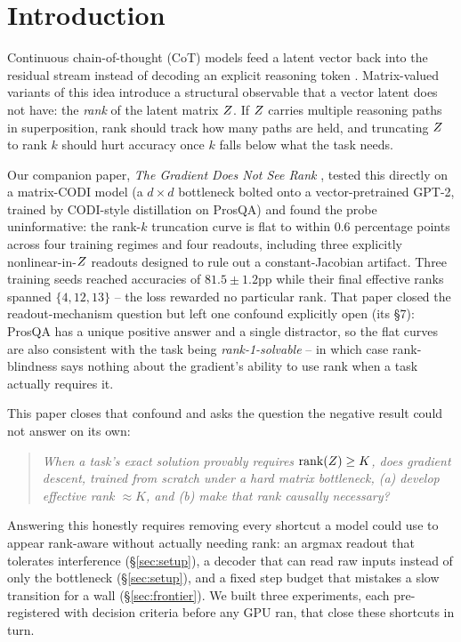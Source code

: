 \section{Introduction}
\label{sec:intro}

Continuous chain-of-thought (CoT) models feed a latent vector back into the
residual stream instead of decoding an explicit reasoning token
\citep{hao2024coconut}. Matrix-valued variants of this idea introduce a
structural observable that a vector latent does not have: the \emph{rank}
of the latent matrix $Z$. If $Z$ carries multiple reasoning paths in
superposition, rank should track how many paths are held, and truncating
$Z$ to rank $k$ should hurt accuracy once $k$ falls below what the task
needs.

Our companion paper, \emph{The Gradient Does Not See Rank}
\citep{larson2026gradient}, tested this directly on a matrix-CODI model (a
$d\times d$ bottleneck bolted onto a vector-pretrained GPT-2, trained by
CODI-style distillation on ProsQA) and found the probe uninformative: the
rank-$k$ truncation curve is flat to within $0.6$ percentage points across
four training regimes and four readouts, including three explicitly
nonlinear-in-$Z$ readouts designed to rule out a constant-Jacobian
artifact. Three training seeds reached accuracies of $81.5\pm1.2$pp while
their final effective ranks spanned $\{4,12,13\}$ -- the loss rewarded no
particular rank. That paper closed the readout-mechanism question but left
one confound explicitly open (its \S7): ProsQA has a unique positive answer
and a single distractor, so the flat curves are also consistent with the
task being \emph{rank-1-solvable} -- in which case rank-blindness says
nothing about the gradient's ability to use rank when a task actually
requires it.

This paper closes that confound and asks the question the negative result
could not answer on its own:

\begin{quote}
\emph{When a task's exact solution provably requires $\operatorname{rank}(Z)\geq K$, does
gradient descent, trained from scratch under a hard matrix bottleneck, (a)
develop effective rank $\approx K$, and (b) make that rank causally
necessary?}
\end{quote}

Answering this honestly requires removing every shortcut a model could use
to appear rank-aware without actually needing rank: an argmax readout that
tolerates interference (\S\ref{sec:setup}), a decoder that can read raw
inputs instead of only the bottleneck (\S\ref{sec:setup}), and a fixed step
budget that mistakes a slow transition for a wall (\S\ref{sec:frontier}).
We built three experiments, each pre-registered with decision criteria
before any GPU ran, that close these shortcuts in turn.

